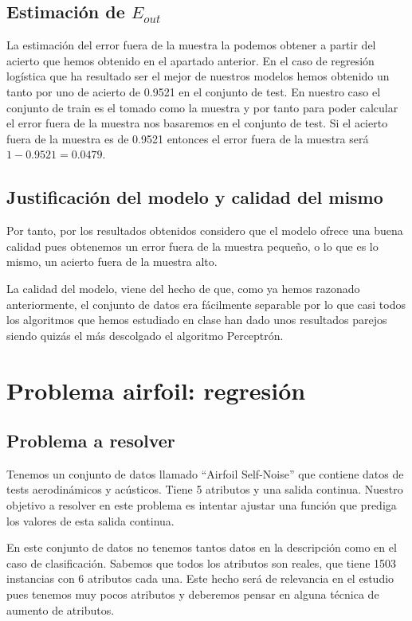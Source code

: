 \documentclass[12pt,a4paper]{article}
\begin{document}
\subsection{Estimación de $E_{out}$}

La estimación del error fuera de la muestra la podemos obtener a partir del acierto que hemos obtenido en el apartado anterior. En el caso de regresión logística que ha resultado ser el mejor de nuestros modelos hemos obtenido un tanto por uno de acierto de 0.9521 en el conjunto de test. En nuestro caso el conjunto de train es el tomado como la muestra y por tanto para poder calcular el error fuera de la muestra nos basaremos en el conjunto de test. Si el acierto fuera de la muestra es de 0.9521 entonces el error fuera de la muestra será $1-0.9521 = 0.0479$.

\subsection{Justificación del modelo y calidad del mismo}

Por tanto, por los resultados obtenidos considero que el modelo ofrece una buena calidad pues obtenemos un error fuera de la muestra pequeño, o lo que es lo mismo,  un acierto fuera de la muestra alto.

La calidad del modelo, viene del hecho de que, como ya hemos razonado anteriormente, el conjunto de datos era fácilmente separable por lo que casi todos los algoritmos que hemos estudiado en clase han dado unos resultados parejos siendo quizás el más descolgado el algoritmo Perceptrón.

\section{Problema airfoil: regresión}

\subsection{Problema a resolver}

Tenemos un conjunto de datos llamado ``Airfoil Self-Noise'' que contiene datos de tests aerodinámicos y acústicos. Tiene 5 atributos y una salida continua. Nuestro objetivo a resolver en este problema es intentar ajustar una función que prediga los valores de esta salida continua.

En este conjunto de datos no tenemos tantos datos en la descripción como en el caso de clasificación. Sabemos que todos los atributos son reales, que tiene 1503 instancias con 6 atributos cada una. Este hecho será de relevancia en el estudio pues tenemos muy pocos atributos y deberemos pensar en alguna técnica de aumento de atributos.
\end{document}
